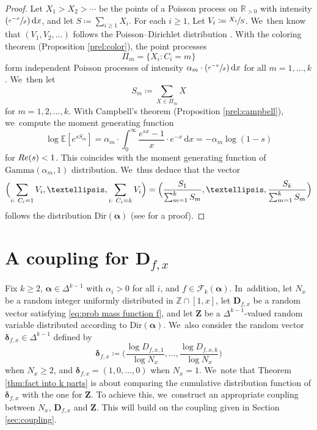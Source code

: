 \documentclass[11pt]{article}
\newcommand{\bD}{{\boldsymbol D}}
\newcommand{\bZ}{{\boldsymbol Z}}
\newcommand{\Psfrac}[2]{(\sfrac{#1}{#2})}
\newcommand{\ZZ}{\mathbb{Z}}
\newcommand{\RR}{\mathbb{R}}
\newcommand{\EE}{\mathbb{E}}
\newcommand{\boldalpha}{\boldsymbol{\alpha}}
\newcommand{\bolddelta}{\boldsymbol{\delta}}
\newcommand{\riemint}[4]{\int_{#1}^{#2}\! #3 \, \mathrm{d}#4}
\renewcommand{\Re}{\textup{Re}}
\newcommand{\simplex}{\Delta^{k-1}}
\newcommand{\bgg}{\Big}
\theoremstyle{plain}
\theoremstyle{definition}
\begin{document}
\begin{proof}
Let $X_1 > X_2 > \cdots$ be the points of a Poisson process on $\RR_{>0}$ with intensity $\Psfrac{e^{-x}}{x} \, \mathrm dx$, and let $S \coloneqq \sum_{i \ge 1} X_i$. For each $i \ge 1$, Let $V_i \coloneqq \sfrac{X_i}{S}$. We~then know that $(V_1, V_2, \ldots)$ follows the Poisson--Dirichlet distribution \cite[Th.\,2.2]{Feng10}. With the coloring theorem (Proposition \ref{prel:color}), the point processes
\[
\Pi_m = \{X_i : C_i = m\}
\]
form independent Poisson processes of intensity $\alpha_m\cdot \Psfrac{e^{-x}}{x} \, \mathrm dx$ for all $m = 1, \ldots, k$. We~then let
\[
S_m \coloneqq \sum_{X \in \Pi_m} X
\]
for $m=1,2,\dots,k$. With Campbell's theorem (Proposition \ref{prel:campbell}), we~compute the moment generating function
\[
\log \EE[e^{sS_m}] = \alpha_m\cdot \riemint{0}{\infty}{\frac{e^{sx}-1}{x}\cdot e^{-x}}{x} = -\alpha_m\log(1-s)
\]
for $\Re(s) < 1$. This coincides with the moment generating function of $\text{Gamma}(\alpha_m, 1)$ distribution. We~thus deduce that the vector
\[
\Bigl(\sum_{i:\ C_i = 1} V_i, \ldots, \sum_{i:\ C_i = k} V_i \Bigr) = \Bigl(\frac{S_1}{\sum_{m=1}^k S_m}, \ldots, \frac{S_k}{\sum_{m=1}^k S_m} \Bigr)
\]
follows the distribution $\text{Dir}(\boldalpha)$ (see \cite[Ch.\,49, pp.\,485-487]{KotzBal00} for a proof).
\end{proof}

\section{A coupling for \texorpdfstring{$\bD_{f, x}$}{bD}}\label{sec:coupling for factorizations}

Fix $k\ge2$, $\boldalpha \in \simplex$ with $\alpha_i>0$ for all $i$, and $f\in\mathcal{F}_k(\boldalpha)$. In~addition, let $N_x$ be a random integer uniformly distributed in $\ZZ \cap [1, x]$, let $\bD_{f, x}$ be a random vector satisfying \eqref{eq:prob mass function f}, and let $\bZ$ be a $\simplex$-valued random variable distributed according to $\text{Dir}(\boldalpha)$. We~also consider the random vector $\bolddelta_{f, x} \in \Delta^{k-1}$ defined by
\begin{equation}
\label{eq:defn delta}
\bolddelta_{f, x} \coloneqq \bgg(\frac{\log D_{f,x,1}}{\log N_x},\dots,\frac{\log D_{f,x,k}}{\log N_x}\bgg)
\end{equation}
when $N_x \ge 2$, and $\bolddelta_{f,x} = (1,0,\ldots,0)$ when $N_x = 1$. We~note that Theorem \ref{thm:fact into k parts} is about comparing the cumulative distribution function of $\bolddelta_{f, x}$ with the one for $\bZ$. To achieve this, we~construct an appropriate coupling between $N_x$, $\bD_{f, x}$ and $\bZ$. This will build on the coupling given in Section \ref{sec:coupling}.
\end{document}
